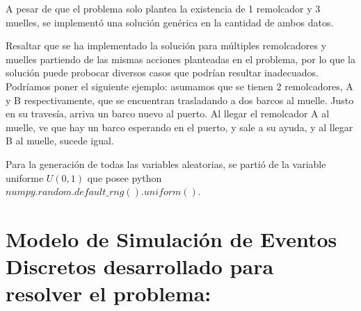 \documentclass[titlepage,11pt]{scrartcl}
\begin{document}
	A pesar de que el problema solo plantea la existencia de 1 remolcador y 3 muelles, se implementó una solución genérica en la cantidad de ambos datos.

	Resaltar que se ha implementado la solución para múltiples remolcadores y muelles partiendo de las mismas acciones planteadas en el problema, por lo que la solución puede probocar diversos casos que podrían resultar inadecuados. Podríamos poner el siguiente ejemplo: asumamos que se tienen 2 remolcadores, A y B respectivamente, que se encuentran trasladando a dos barcos al muelle. Justo en su travesía, arriva un barco nuevo al puerto. Al llegar el remolcador A al muelle, ve que hay un barco esperando en el puerto, y sale a su ayuda, y al llegar B al muelle, sucede igual.

	Para la generación de todas las variables aleatorias, se partió de la variable uniforme $U(0, 1)$ que posee python $numpy.random.default\_rng().uniform()$.


\section{Modelo de Simulación de Eventos Discretos desarrollado para resolver el problema:}
\end{document}
